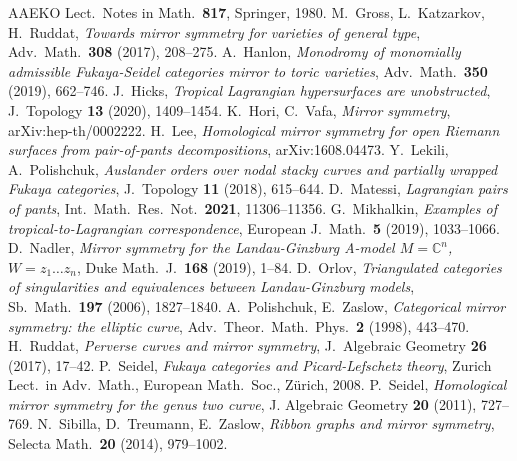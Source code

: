 \documentclass[11pt,leqno]{amsart}
\numberwithin{equation}{section}
\def\C{\mathbb{C}}
\begin{document}
\begin{thebibliography}{AAEKO}
   Lect.\ Notes in Math.\ {\bf 817}, Springer, 1980.
   M.~Gross, L.~Katzarkov, H.~Ruddat, 
   {\sl Towards mirror symmetry for varieties of general type},
   Adv.\ Math.\ {\bf 308} (2017), 208--275.
   A.~Hanlon, {\sl Monodromy of monomially admissible Fukaya-Seidel categories mirror to toric
varieties}, Adv.\ Math.\ {\bf 350} (2019), 662--746.
   J.~Hicks, {\sl Tropical Lagrangian hypersurfaces are unobstructed},
   J.\ Topology {\bf 13} (2020), 1409--1454.
   K.~Hori, C.~Vafa, {\sl Mirror symmetry},
   arXiv:hep-th/0002222.
   H.~Lee, 
   {\sl Homological mirror symmetry for open Riemann surfaces from pair-of-pants decompositions}, 
   arXiv:1608.04473.
   Y.~Lekili, A.~Polishchuk,
   {\sl Auslander orders over nodal stacky curves and partially wrapped Fukaya categories}, 
   J.\ Topology {\bf 11} (2018), 615--644.
   D.~Matessi, {\sl Lagrangian pairs of pants}, Int.\ Math.\ Res.\ Not.\
   {\bf 2021}, 11306--11356.
   G.~Mikhalkin, {\sl Examples of tropical-to-Lagrangian correspondence},
   European J.\ Math.\ {\bf 5} (2019), 1033--1066.
   D.~Nadler,
   {\sl Mirror symmetry for the Landau-Ginzburg A-model $M=\C^n$, $W=z_1\dots z_n$},
   Duke Math.\ J.\ {\bf 168} (2019), 1--84.
   D.~Orlov, {\sl Triangulated categories of singularities and equivalences
   between Landau-Ginzburg models}, Sb.\ Math.\ {\bf 197} (2006), 1827--1840.
\bibitem[PZ]{PZ}
   A.~Polishchuk, E.~Zaslow,
   {\sl Categorical mirror symmetry: the elliptic curve},
   Adv.\ Theor.\ Math.\ Phys.\ {\bf 2} (1998), 443--470.
   H.~Ruddat,
   {\sl Perverse curves and mirror symmetry},
   J.\ Algebraic Geometry {\bf 26} (2017), 17--42.
   P.~Seidel,
   {\it Fukaya categories and Picard-Lefschetz theory},
   Zurich Lect.\ in Adv.\ Math., European Math.\ Soc., Z\"urich, 2008.
\bibitem[Se2]{SeGenus2}
   P.~Seidel, {\sl Homological mirror symmetry for the genus two curve},  
   J. Algebraic Geometry {\bf 20} (2011), 727--769.
   N.~Sibilla, D.~Treumann, E.~Zaslow,
   {\sl Ribbon graphs and mirror symmetry},
   Selecta Math.\ {\bf 20} (2014), 979--1002.
\end{thebibliography}
\end{document}
